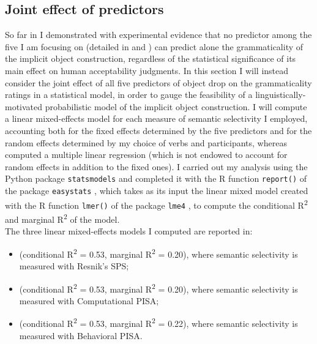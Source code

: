 \subsection{Joint effect of predictors}  

So far in  I demonstrated with experimental evidence that no predictor among the five I am focusing on (detailed in  and ) can predict alone the grammaticality of the implicit object construction, regardless of the statistical significance of its main effect on human acceptability judgments. In this section I will instead consider the joint effect of all five predictors of object drop on the grammaticality ratings in a statistical model, in order to gauge the feasibility of a linguistically-motivated probabilistic model of the implicit object construction. I will compute a linear mixed-effects model for each measure of semantic selectivity I employed, accounting both for the fixed effects determined by the five predictors and for the random effects determined by my choice of verbs and participants, whereas \textcite[131]{Medina2007} computed a multiple linear regression (which is not endowed to account for random effects in addition to the fixed ones). I carried out my analysis using the Python package \texttt{statsmodels} and completed it with the R function \texttt{report()} of the package \texttt{easystats} \parencite{r_report}, which takes as its input the linear mixed model created with the R function \texttt{lmer()} of the package \texttt{lme4} \parencite{r_lmer}, to compute the conditional R\textsuperscript{2} and marginal R\textsuperscript{2} of the model.\\
The three linear mixed-effects models I computed are reported in:
\begin{itemize}
    \item {} (conditional R\textsuperscript{2} = 0.53, marginal R\textsuperscript{2} = 0.20), where semantic selectivity is measured with Resnik's SPS;
    \item {} (conditional R\textsuperscript{2} = 0.53, marginal R\textsuperscript{2} = 0.20), where semantic selectivity is measured with Computational PISA;
    \item {} (conditional R\textsuperscript{2} = 0.53, marginal R\textsuperscript{2} = 0.22), where semantic selectivity is measured with Behavioral PISA.
\end{itemize}

